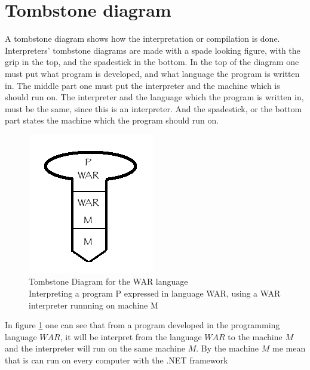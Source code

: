 \section{Tombstone diagram}

A tombstone diagram shows how the interpretation or compilation is done. Interpreters' tombstone diagrams are made with a spade looking figure, with the grip in the top, and the spadestick in the bottom. In the top of the diagram one must put what program is developed, and what language the program is written in. The middle part one must put the interpreter and the machine which is should run on. The interpreter and the language which the program is written in, must be the same, since this is an interpreter. And the spadestick, or the bottom part states the machine which the program should run on.

			\begin{figure}
				\centering
				\includegraphics{rapport/3/figures/tombstone}
				\caption{Tombstone Diagram for the WAR language\\ Interpreting a program P expressed in language WAR, using a WAR interpreter runnning on machine M} \label{fig:tombstone}
			\end{figure}
			
In figure \ref{fig:tombstone} one can see that from a program developed in the programming language $WAR$, it will be interpret from the language $WAR$ to the machine $M$ and the interpreter will run on the same machine $M$. By the machine $M$ me mean that is can run on every computer with the .NET framework
